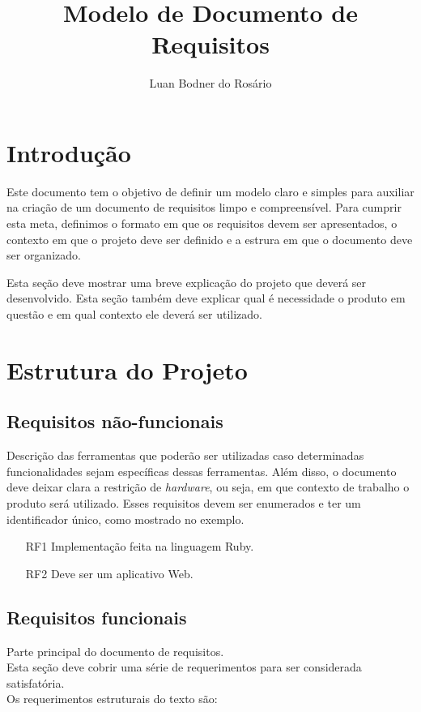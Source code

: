 \documentclass[12pt,a4paper,final]{report}
\author{Luan Bodner do Rosário}
\title{Modelo de Documento de Requisitos}
\begin{document}
\maketitle
\section*{Introdução}

Este documento tem o objetivo de definir um modelo claro e simples para auxiliar na criação de um documento de requisitos limpo e compreensível.
Para cumprir esta meta, definimos o formato em que os requisitos devem ser apresentados, o contexto em que o projeto deve ser definido e a estrura em que o documento deve ser organizado.

Esta seção deve mostrar uma breve explicação do projeto que deverá ser desenvolvido. Esta seção também deve explicar qual é necessidade o produto em questão e em qual contexto ele deverá ser utilizado.

\section*{Estrutura do Projeto}

\subsection*{Requisitos não-funcionais}

Descrição das ferramentas que poderão ser utilizadas caso determinadas funcionalidades sejam específicas dessas ferramentas. Além disso, o documento deve deixar clara a restrição de \textit{hardware}, ou seja, em que contexto de trabalho o produto será utilizado.
Esses requisitos devem ser enumerados e ter um identificador único, como mostrado no exemplo.
\begin{enumerate}
\item[RF1] Implementação feita na linguagem Ruby.
\item[RF2] Deve ser um aplicativo Web.
\end{enumerate}

\subsection*{Requisitos funcionais}

Parte principal do documento de requisitos.\\
Esta seção deve cobrir uma série de requerimentos para ser considerada satisfatória.\\
Os requerimentos estruturais do texto são:
\end{document}
